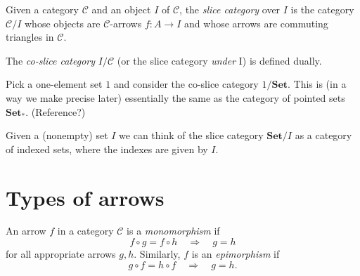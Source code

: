 \documentclass[article, a4paper, 11pt, oneside]{memoir}
\numberwithin{equation}{chapter}
\newcommand{\cat}[1]{\mathcal{#1}}
\newcommand{\ncat}[1]{\mathbf{#1}} %
\newcommand{\catSet}{\ncat{Set}}
\newcommand{\catC}{\cat{C}}
\theoremstyle{myexample}
\theoremstyle{myexamplebreak}
\begin{document}
\begin{definition}
    Given a category $\catC$ and an object $I$ of $\catC$, the \emph{slice category} over $I$ is the category $\catC/I$ whose objects are $\catC$-arrows $f \colon A \to I$ and whose arrows are commuting triangles in $\catC$.

    The \emph{co-slice category} $I/\catC$ (or the slice category \emph{under} I) is defined dually.
\end{definition}


\begin{examplebreak}
    \begin{enumexample}
        \item Pick a one-element set $1$ and consider the co-slice category $1/\catSet$. This is (in a way we make precise later) essentially the same as the category of pointed sets $\catSet_*$. (Reference?)
        
        \item Given a (nonempty) set $I$ we can think of the slice category $\catSet/I$ as a category of indexed sets, where the indexes are given by $I$.
    \end{enumexample}
\end{examplebreak}



\chapter{Types of arrows}

\begin{definition}
    An arrow $f$ in a category $\catC$ is a \emph{monomorphism} if
    \begin{equation*}
        f \circ g = f \circ h
            \quad \Rightarrow \quad
            g = h
    \end{equation*}
    for all appropriate arrows $g, h$. Similarly, $f$ is an \emph{epimorphism} if
    \begin{equation*}
        g \circ f = h \circ f
            \quad \Rightarrow \quad
            g = h.
    \end{equation*}
\end{definition}
\end{document}
